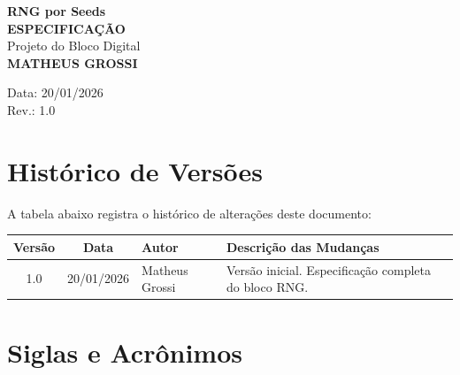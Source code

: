 \documentclass[12pt, a4paper]{article}
\begin{document}
	
	\begin{titlepage}
		\centering
		\vspace*{2cm}
		
		{\LARGE \textbf{RNG por Seeds}}\\[0.5cm]
		{\Huge \textbf{ESPECIFICAÇÃO}}\\[1.5cm]
		
		{\Large Projeto do Bloco Digital}\\[2cm]
		
		{\Large \textbf{MATHEUS GROSSI}}\\[3cm]
		
		\vfill
		
		Data: 20/01/2026\\
		Rev.: 1.0
		
		\vspace*{1cm}
	\end{titlepage}
	
	\section*{Histórico de Versões}
	
	A tabela abaixo registra o histórico de alterações deste documento:
	
	\begin{table}[h]
		\centering
		\begin{tabularx}{\textwidth}{|c|c|X|X|}
			\hline
			\textbf{Versão} & \textbf{Data} & \textbf{Autor} & \textbf{Descrição das Mudanças} \\
			\hline
			1.0 & 20/01/2026 & Matheus Grossi & Versão inicial. Especificação completa do bloco RNG. \\
			\hline
		\end{tabularx}
	\end{table}
	
	\section*{Siglas e Acrônimos}
	
\end{document}
